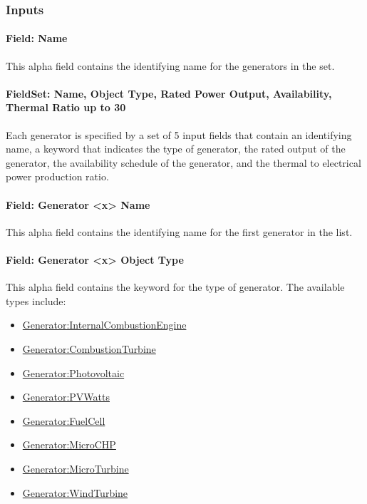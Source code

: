\subsubsection{Inputs}\label{inputs-2-011}

\paragraph{Field: Name}\label{field-name-1-011}

This alpha field contains the identifying name for the generators in the set.

\paragraph{FieldSet: Name, Object Type, Rated Power Output, Availability, Thermal Ratio up to 30}\label{fieldset-name-object-type-rated-power-output-availability-thermal-ratio-up-to-30}

Each generator is specified by a set of 5 input fields that contain an identifying name, a keyword that indicates the type of generator, the rated output of the generator, the availability schedule of the generator, and the thermal to electrical power production ratio.

\paragraph{Field: Generator \textless{}x\textgreater{} Name}\label{field-generator-x-name}

This alpha field contains the identifying name for the first generator in the list.

\paragraph{Field: Generator \textless{}x\textgreater{} Object Type}\label{field-generator-x-object-type}

This alpha field contains the keyword for the type of generator. The available types include:

\begin{itemize}
\item
  \hyperref[generatorinternalcombustionengine]{Generator:InternalCombustionEngine}
\item
  \hyperref[generatorcombustionturbine]{Generator:CombustionTurbine}
\item
  \hyperref[generatorphotovoltaic-000]{Generator:Photovoltaic}
\item
  \hyperref[generatorpvwatts]{Generator:PVWatts}
\item
  \hyperref[generatorfuelcell]{Generator:FuelCell}
\item
  \hyperref[generatormicrochp]{Generator:MicroCHP}
\item
  \hyperref[generatormicroturbine]{Generator:MicroTurbine}
\item
  \hyperref[generatorwindturbine]{Generator:WindTurbine}
\end{itemize}

